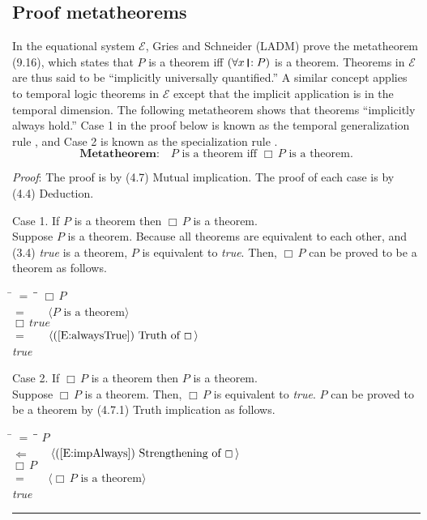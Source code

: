 \documentclass[12pt, fleqn, leqno]{article}
\newcommand{\lgap}{2pt}                             %
\newcommand{\mymathindent}{24pt}                    %
\newcommand{\foll}{\ensuremath{\Leftarrow}}         %
\newcommand{\Always}{\Box\,}
\newcommand{\myqed}{\rule[-.23ex]{1.2ex}{2.0ex}}
\newcommand{\myqedtab}{\hspace{384pt}}              %
\newcommand{\thedr}{\rule[-.25ex]{.32mm}{1.75ex}}   %
\newcommand{\drrb}{\;\thedr\,{:}\;}                 %
\newcommand{\all}{\forall}                          %
\newcommand{\Gll} {\langle}                         %
\newcommand{\Ggg} {\rangle}                         %
\newcommand{\Hint}[1]     {\ \ \ $\Gll              \mbox{#1} \Ggg$ }   %
\begin{document}
\subsection{Proof metatheorems}

In the equational system $\mathcal{E}$, Gries and Schneider (LADM) prove the metatheorem (9.16), which states that
$P$ is a theorem iff $(\all x\drrb P)$ is a theorem. \cite{LADM}
Theorems in $\mathcal{E}$ are thus said to be ``implicitly universally quantified.''
A similar concept applies to temporal logic theorems in $\mathcal{E}$ except that the implicit application is in the temporal dimension.
The following metatheorem shows that theorems ``implicitly always hold.''
Case 1 in the proof below is known as the temporal generalization rule \cite{Schn}, and Case 2 is known as the specialization rule \cite{Manna}.
\begin{equation}\label{E:metatheorem}
\textbf{Metatheorem:}\quad P \text{ is a theorem iff } \Always P \text{ is a theorem.}
\end{equation}

\emph{Proof}: The proof is by (4.7) Mutual implication.
The proof of each case is by (4.4) Deduction.

Case 1. If $P$ is a theorem then $\Always P$ is a theorem.\\
Suppose $P$ is a theorem.
Because all theorems are equivalent to each other, and (3.4) \textit{true} is a theorem, $P$ is equivalent to \textit{true}.
Then, $\Always P$ can be proved to be a theorem as follows.
\begin{tabbing}
\hspace{\mymathindent} \= $= \;$ \= \myqedtab \= \kill
\> \> $\Always P$\\[\lgap]
\> $=$ \> \Hint{$P$ is a theorem} \\[\lgap]
\> \> $\Always \mathit{true}$\\[\lgap]
\> $=$ \> \Hint{(\ref{E:alwaysTrue}) Truth of $\Always$} \\[\lgap]
\> \> \textit{true}
\end{tabbing}

Case 2. If $\Always P$ is a theorem then $P$ is a theorem.\\
Suppose $\Always P$ is a theorem.
Then, $\Always P$ is equivalent to \textit{true}.
$P$ can be proved to be a theorem by (4.7.1) Truth implication as follows.
\begin{tabbing}
\hspace{\mymathindent} \= $= \;$ \= \myqedtab \= \kill
\> \> $P$\\[\lgap]
\> $\foll$ \> \Hint{(\ref{E:impAlways}) Strengthening of $\Always$} \\[\lgap]
\> \> $\Always P$\\[\lgap]
\> $=$ \> \Hint{$\Always P$ is a theorem} \\[\lgap]
\> \> \textit{true} \quad \myqed
\end{tabbing}
\end{document}
